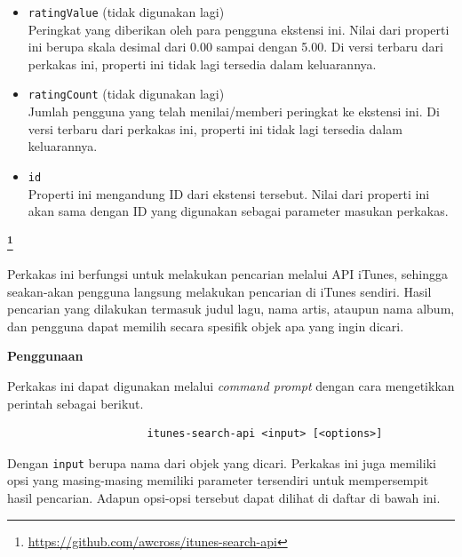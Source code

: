 \documentclass[a4paper,twoside]{article}
\begin{document}
\begin{enumerate}
\begin{itemize}
	\item \verb|ratingValue| (tidak digunakan lagi)\\
	Peringkat yang diberikan oleh para pengguna ekstensi ini. Nilai dari properti ini berupa skala desimal dari 0.00 sampai dengan 5.00. Di versi terbaru dari perkakas ini, properti ini tidak lagi tersedia dalam keluarannya.
	\item \verb|ratingCount| (tidak digunakan lagi)\\
	Jumlah pengguna yang telah menilai/memberi peringkat ke ekstensi ini. Di versi terbaru dari perkakas ini, properti ini tidak lagi tersedia dalam keluarannya.
	\item \verb|id|\\
	Properti ini mengandung ID dari ekstensi tersebut. Nilai dari properti ini akan sama dengan ID yang digunakan sebagai parameter masukan perkakas.
\end{itemize}
\vfill
\large{\textbf{\itunesapi\footnote{\href{https://github.com/awcross/itunes-search-api}{https://github.com/awcross/itunes-search-api}}}}
\label{sec:similarapps-itunesapi}

Perkakas \cl ini berfungsi untuk melakukan pencarian melalui API iTunes, sehingga seakan-akan pengguna langsung melakukan pencarian di iTunes sendiri. Hasil pencarian yang dilakukan termasuk judul lagu, nama artis, ataupun nama album, dan pengguna dapat memilih secara spesifik objek apa yang ingin dicari.

\textbf{Penggunaan}
\label{sec:similarapps-itunesapi-usage}

Perkakas ini dapat digunakan melalui \textit{command prompt} dengan cara mengetikkan perintah sebagai berikut.

\begin{verbatim}
                      itunes-search-api <input> [<options>]
\end{verbatim}

Dengan \verb|input| berupa nama dari objek yang dicari. Perkakas ini juga memiliki opsi yang masing-masing memiliki parameter tersendiri untuk mempersempit hasil pencarian. Adapun opsi-opsi tersebut dapat dilihat di daftar di bawah ini.


\end{enumerate}
\end{document}
